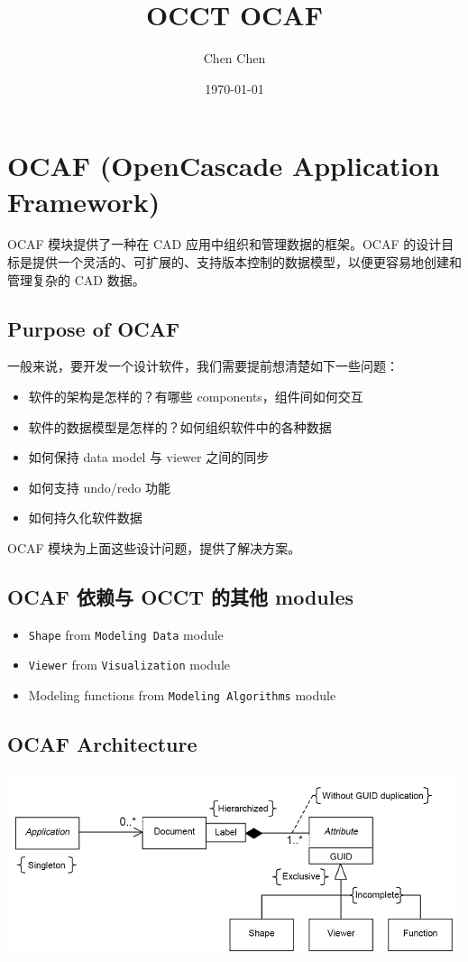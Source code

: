 \documentclass[11pt]{article}
\author{Chen Chen}
\date{\today}
\title{OCCT OCAF}
\begin{document}
\maketitle
\tableofcontents

\section{OCAF (OpenCascade Application Framework)}
\label{sec:org0019406}

OCAF 模块提供了一种在 CAD 应用中组织和管理数据的框架。OCAF 的设计目标是提供一个灵活的、可扩展的、支持版本控制的数据模型，以便更容易地创建和管理复杂的 CAD 数据。
\subsection{Purpose of OCAF}
\label{sec:org1bfde9b}

一般来说，要开发一个设计软件，我们需要提前想清楚如下一些问题：

\begin{itemize}
\item 软件的架构是怎样的？有哪些 components，组件间如何交互
\item 软件的数据模型是怎样的？如何组织软件中的各种数据
\item 如何保持 data model 与 viewer 之间的同步
\item 如何支持 undo/redo 功能
\item 如何持久化软件数据
\end{itemize}

OCAF 模块为上面这些设计问题，提供了解决方案。
\subsection{OCAF 依赖与 OCCT 的其他 modules}
\label{sec:org116a232}

\begin{itemize}
\item \texttt{Shape} from \texttt{Modeling Data} module
\item \texttt{Viewer} from \texttt{Visualization} module
\item Modeling functions from \texttt{Modeling Algorithms} module
\end{itemize}
\subsection{OCAF Architecture}
\label{sec:org9111205}

\begin{center}
\includegraphics[width=.9\linewidth]{./img/application-document-attribute-model.png}
\end{center}
\end{document}
